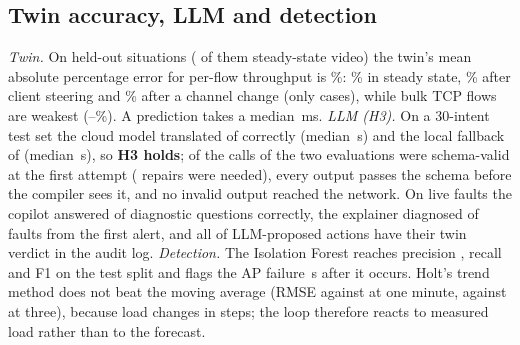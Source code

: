 \documentclass[conference]{IEEEtran}
\begin{document}
\subsection{Twin accuracy, LLM and detection}
\emph{Twin.} On \TwinN{} held-out situations (\TwinSteadyN{} of them steady-state video) the twin's mean absolute percentage error for per-flow throughput is \TwinMape\%: \TwinSteadyVideo\% in steady state, \TwinSteer\% after client steering and \TwinChannel\% after a channel change (only \TwinChannelN{} cases), while bulk TCP flows are weakest (\TwinBulkLow--\TwinBulkHigh\%). A prediction takes a median \SimMedianMs\,ms. \emph{LLM (H3).} On a 30-intent test set the cloud model translated \IntCloudOk{} of \IntCases{} correctly (median \IntCloudSeconds\,s) and the local fallback \IntLocalOk{} of \IntCases{} (median \IntLocalSeconds\,s), so \textbf{H3 holds}; \IntFirstValid{} of the \IntCalls{} calls of the two evaluations were schema-valid at the first attempt (\IntRepairs{} repairs were needed), every output passes the schema before the compiler sees it, and no invalid output reached the network. On live faults the copilot answered \GenCopilotOk{} of \GenCopilotN{} diagnostic questions correctly, the explainer diagnosed \GenRcaOk{} of \GenRcaN{} faults from the first alert, and all \GenActionsVerdict{} of \GenActions{} LLM-proposed actions have their twin verdict in the audit log. \emph{Detection.} The Isolation Forest reaches precision \AnoPrecision, recall \AnoRecall{} and F1 \AnoF{} on the test split and flags the AP failure \AnoDelayFail\,s after it occurs. Holt's trend method does not beat the moving average (RMSE \FcHoltOne{} against \FcMaOne{} at one minute, \FcHoltThree{} against \FcMaThree{} at three), because load changes in steps; the loop therefore reacts to measured load rather than to the forecast.
\end{document}

